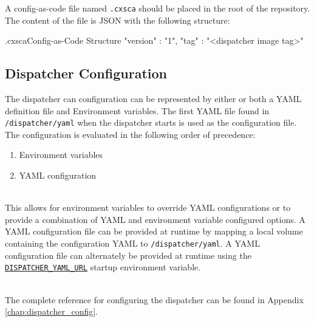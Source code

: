 A config-as-code file named \texttt{.cxsca} should be placed in the root of the repository.  
The content of the file is JSON with the following structure:
\\
\begin{code}{.cxsca}{Config-as-Code Structure}{}
{
    "version" : "1",
    "tag" : "<dispatcher image tag>"
}
\end{code}

\subsection{\cxflowplusplus Dispatcher Configuration}

The dispatcher can configuration can be represented by either or both a YAML definition file and 
Environment variables.  The first YAML file found in \texttt{/dispatcher/yaml} when 
the dispatcher starts is used as the configuration file.  The configuration is 
evaluated in the following order of precedence:

\begin{enumerate}
\item Environment variables
\item YAML configuration
\end{enumerate}

\noindent\\This allows for environment variables to override YAML configurations or to provide
a combination of YAML and environment variable configured options.  A YAML configuration
file can be provided at runtime by mapping a local volume containing the configuration YAML to 
\texttt{/dispatcher/yaml}.  A YAML configuration file can alternately be provided at runtime
using the \hyperref[sec:DISPATCHERYAMLURL]{\texttt{DISPATCHER\_YAML\_URL}} \cxflowplusplus startup
environment variable. 

\noindent\\The complete reference for configuring the dispatcher can be found in
Appendix \ref{chap:dispatcher_config}.

